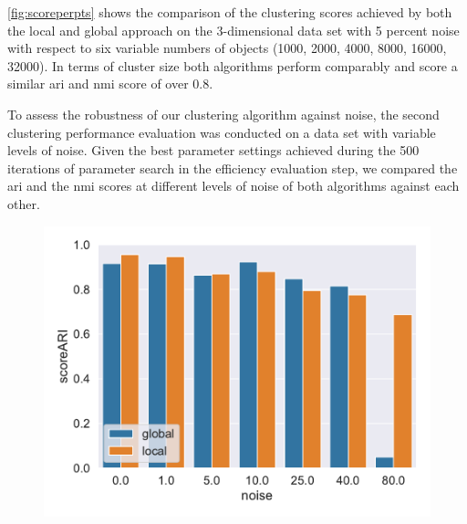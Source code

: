\autoref{fig:scoreperpts} shows the comparison of the clustering scores achieved by both the local and global approach on the 3-dimensional data set with 5 percent noise with respect to six variable numbers of objects (1000, 2000, 4000, 8000, 16000, 32000). In terms of cluster size both algorithms perform comparably and score a similar \gls{ari} and \gls{nmi} score of over $0.8$. 

To assess the robustness of our clustering algorithm against noise, the second clustering performance evaluation was conducted on a data set with variable levels of noise. Given the best parameter settings achieved during the 500 iterations of parameter search in the efficiency evaluation step, we compared the \gls{ari} and the \gls{nmi} scores at different levels of noise of both algorithms against each other.
\begin{figure}[h]
    \centering
    \begin{minipage}[t]{.5\textwidth}
      \centering  
      \captionsetup{width=.9\linewidth}
      \includegraphics[width=\textwidth]{evaluation/per_noise/Best_ARI_3D_O10000_pnoise_bar.pdf}
      \label{fig:ariperpts}
    \end{minipage}%
    \begin{minipage}[t]{.5\textwidth}
      \centering
      \captionsetup{width=.9\linewidth}

\end{minipage}
\end{figure}
